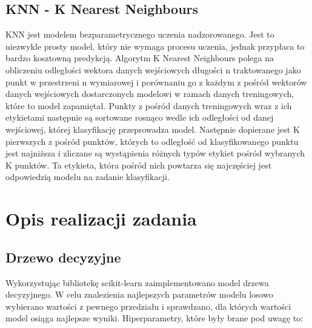 \documentclass{article}
\begin{document}
\subsection{KNN - K Nearest Neighbours}
KNN jest modelem bezparametrycznego uczenia nadzorowanego. Jest to niezwykle prosty model,
 który nie wymaga procesu uczenia, jednak przypłaca to bardzo kosztowną predykcją.
Algorytm K Nearest Neighbours polega na obliczeniu odległości wektora danych wejściowych 
długości n traktowanego jako punkt w przestrzeni n wymiarowej i porównaniu go z każdym z 
pośród wektorów danych wejściowych dostarczonych modelowi w ramach danych treningowych, 
które to model zapamiętał. Punkty z pośród danych treningowych wraz z ich etykietami 
następnie są sortowane rosnąco wedle ich odległości od danej wejściowej, której 
klasyfikację przeprowadza model. Następnie dopierane jest K pierwszych z pośród 
punktów, których to odległość od klasyfikowanego punktu jest najniższa i zliczane 
są wystąpienia różnych typów etykiet pośród wybranych K punktów. Ta etykieta, 
która pośród nich powtarza się najczęściej jest odpowiedzią modelu na zadanie klasyfikacji.

\section{Opis realizacji zadania}

\subsection{Drzewo decyzyjne}

Wykorzystując bibliotekę scikit-learn zaimplementowano model drzewa
decyzyjnego. W celu znalezienia najlepszych parametrów modelu losowo
wybierano wartości z pewnego przedziału i sprawdzano, dla których wartości
model osiąga najlepsze wyniki. Hiperparametry, które były brane pod uwagę to:
\end{document}
